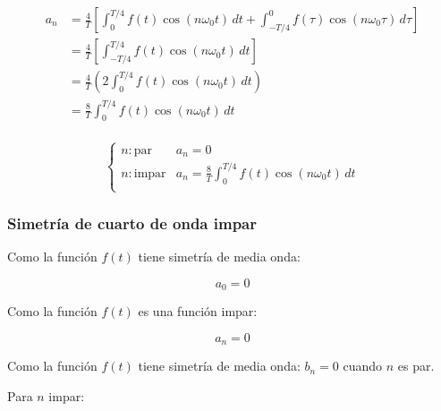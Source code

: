 \begin{equation*}
\begin{split}
    a_n
        &=\frac{4}{T}\left[
            \int_0^{T/4} f(t)\cos(n\omega_0 t)\,dt+
            \int_{-T/4}^0 f(\tau)\cos(n\omega_0\tau)\,d\tau
        \right]\\
        &=\frac{4}{T}\left[\int_{-T/4}^{T/4} f(t)\cos(n\omega_0 t)\,dt\right]\\
        &=\frac{4}{T}\left(2\int_0^{T/4} f(t)\cos(n\omega_0 t)\,dt\right)\\
        &=\frac{8}{T}\int_0^{T/4} f(t)\cos(n\omega_0 t)\,dt\\
\end{split}
\end{equation*}

\begin{equation}
\begin{cases}
    n: \text{par}   &a_n=0\\
    n: \text{impar} &a_n=\frac{8}{T}\int_0^{T/4}f(t)\cos(n\omega_0 t)\,dt\\
\end{cases}
\end{equation}

\subsubsection{Simetría de cuarto de onda impar}
Como la función $f(t)$ tiene simetría de media onda:

\begin{equation}
    a_0=0
\end{equation}

Como la función $f(t)$ es una función impar:

\begin{equation}
    a_n=0
\end{equation}

Como la función $f(t)$ tiene simetría de media onda: $b_n=0$ cuando $n$ es par.

Para $n$ impar:

